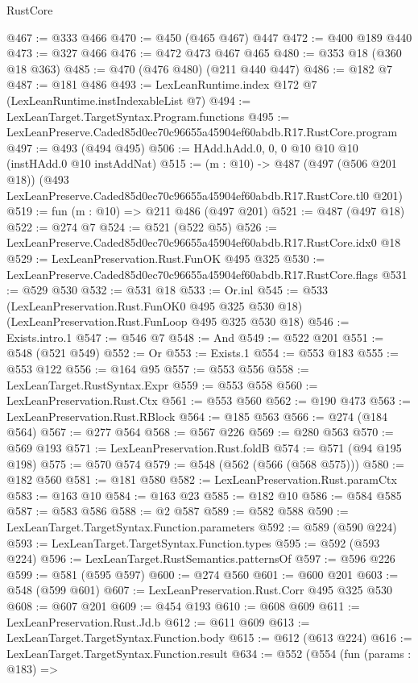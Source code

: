 \begin{lexlean}{RustCore}
\begin{coremodule}
@467 := @333 @466
@470 := @450 (@465 @467) @447
@472 := @400 @189 @440
@473 := @327 @466
@476 := @472 @473 @467 @465
@480 := @353 @18 (@360 @18 @363)
@485 := @470 (@476 @480) (@211 @440 @447)
@486 := @182 @7
@487 := @181 @486
@493 := LexLeanRuntime.index @172 @7 (LexLeanRuntime.instIndexableList @7)
@494 := LexLeanTarget.TargetSyntax.Program.functions
@495 := LexLeanPreserve.Caded85d0ec70c96655a45904ef60abdb.R17.RustCore.program
@497 := @493 (@494 @495)
@506 := HAdd.hAdd.{0, 0, 0} @10 @10 @10 (instHAdd.{0} @10 instAddNat)
@515 := (m : @10) ->
  @487
    (@497 (@506 @201 @18))
    (@493 LexLeanPreserve.Caded85d0ec70c96655a45904ef60abdb.R17.RustCore.tl0 @201)
@519 := fun (m : @10) => @211 @486 (@497 @201)
@521 := @487 (@497 @18)
@522 := @274 @7
@524 := @521 (@522 @55)
@526 := LexLeanPreserve.Caded85d0ec70c96655a45904ef60abdb.R17.RustCore.idx0 @18
@529 := LexLeanPreservation.Rust.FunOK @495 @325
@530 := LexLeanPreserve.Caded85d0ec70c96655a45904ef60abdb.R17.RustCore.flags
@531 := @529 @530
@532 := @531 @18
@533 := Or.inl
@545 := @533
    (LexLeanPreservation.Rust.FunOK0 @495 @325 @530 @18)
    (LexLeanPreservation.Rust.FunLoop @495 @325 @530 @18)
@546 := Exists.intro.{1}
@547 := @546 @7
@548 := And
@549 := @522 @201
@551 := @548 (@521 @549)
@552 := Or
@553 := Exists.{1}
@554 := @553 @183
@555 := @553 @122
@556 := @164 @95
@557 := @553 @556
@558 := LexLeanTarget.RustSyntax.Expr
@559 := @553 @558
@560 := LexLeanPreservation.Rust.Ctx
@561 := @553 @560
@562 := @190 @473
@563 := LexLeanPreservation.Rust.RBlock
@564 := @185 @563
@566 := @274 (@184 @564)
@567 := @277 @564
@568 := @567 @226
@569 := @280 @563
@570 := @569 @193
@571 := LexLeanPreservation.Rust.foldB
@574 := @571 (@94 @195 @198)
@575 := @570 @574
@579 := @548 (@562 (@566 (@568 @575)))
@580 := @182 @560
@581 := @181 @580
@582 := LexLeanPreservation.Rust.paramCtx
@583 := @163 @10
@584 := @163 @23
@585 := @182 @10
@586 := @584 @585
@587 := @583 @586
@588 := @2 @587
@589 := @582 @588
@590 := LexLeanTarget.TargetSyntax.Function.parameters
@592 := @589 (@590 @224)
@593 := LexLeanTarget.TargetSyntax.Function.types
@595 := @592 (@593 @224)
@596 := LexLeanTarget.RustSemantics.patternsOf
@597 := @596 @226
@599 := @581 (@595 @597)
@600 := @274 @560
@601 := @600 @201
@603 := @548 (@599 @601)
@607 := LexLeanPreservation.Rust.Corr @495 @325 @530
@608 := @607 @201
@609 := @454 @193
@610 := @608 @609
@611 := LexLeanPreservation.Rust.Jd.b
@612 := @611 @609
@613 := LexLeanTarget.TargetSyntax.Function.body
@615 := @612 (@613 @224)
@616 := LexLeanTarget.TargetSyntax.Function.result
@634 := @552
    (@554
      (fun (params : @183) =>

\end{coremodule}
\end{lexlean}
